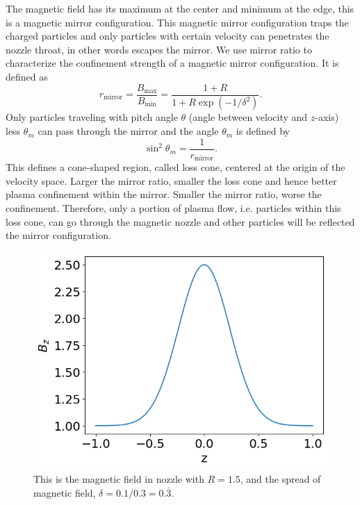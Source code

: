 The magnetic field has its maximum at the center and minimum at the edge, this is a magnetic mirror configuration. This magnetic mirror configuration traps the charged particles and only particles with certain velocity can penetrates the nozzle throat, in other words escapes the mirror. We use mirror ratio to characterize the confinement strength of a magnetic mirror configuration. It is defined as
\begin{equation}
	r_{\text{mirror}} = \frac{B_{\text{max}}}{B_{\text{min}}} = \frac{1+R}{1+R\exp(-1/\delta^2)}.
\end{equation}
Only particles traveling with pitch angle $\theta$ (angle between velocity and $z$-axis) less $\theta_m$ can pass through the mirror and the angle $\theta_m$ is defined by \cite{chen_introduction_2016}
\begin{equation}
	\sin^2\theta_m = \frac{1}{r_{\text{mirror}}}.
\end{equation}
This defines a cone-shaped region, called loss cone, centered at the origin of the velocity space. Larger the mirror ratio, smaller the loss cone and hence better plasma confinement within the mirror. Smaller the mirror ratio, worse the confinement. Therefore, only a portion of plasma flow, i.e. particles within this loss cone, can go through the magnetic nozzle and other particles will be reflected the mirror configuration.

\begin{figure}[htbp]
	\centering
	\includegraphics[width=0.7\linewidth]{figures/magnetic-field}
	\caption{This is the magnetic field in nozzle with $R=1.5$, and the spread of magnetic field, $\delta=0.1/0.3=0.\bar{3}$. }
	\label{fig:magnetic-field}
\end{figure}


